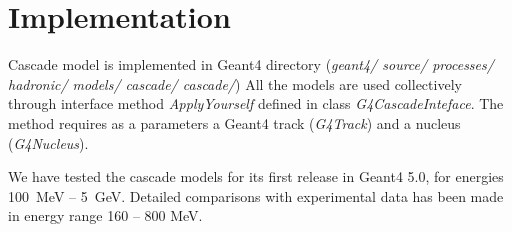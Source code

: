\section{Implementation}


Cascade model is implemented in {\sc Geant4} directory ({\it geant4/ source/ processes/ hadronic/ models/ cascade/ cascade/})
All the models are used collectively through interface method {\it ApplyYourself} defined in class {\it G4CascadeInteface}.
The method requires as a parameters a {\sc Geant4} track  ({\it G4Track}) and a nucleus ({\it G4Nucleus}). 

We have tested the cascade models for its first release in {\sc Geant4 5.0}, for energies 100~MeV -- 5~GeV. 
Detailed comparisons with experimental data has been made in energy range 160 -- 800 MeV. 

